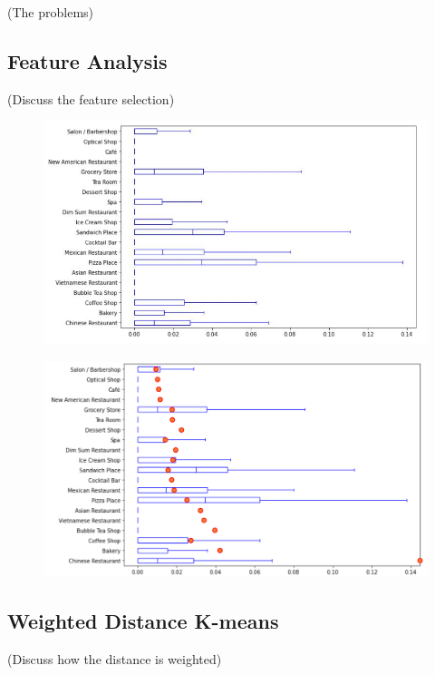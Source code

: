 \documentclass{article}
\begin{document}
(The problems)

\newpage

\subsection{Feature Analysis}

(Discuss the feature selection)

\begin{figure}[h!]
\includegraphics[width=1.0\textwidth]{cn2.jpg}
\centering
\end{figure}

\begin{figure}[h!]
\includegraphics[width=1.0\textwidth]{cn3.pdf}
\centering
\end{figure}

\newpage

\subsection{Weighted Distance K-means}

(Discuss how the distance is weighted)
\end{document}
